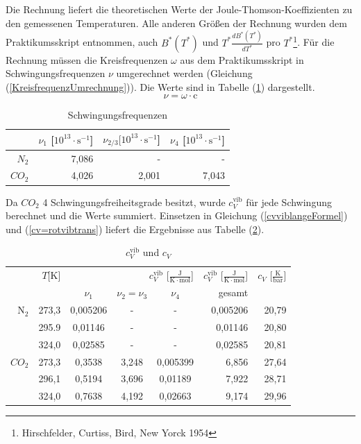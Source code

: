\documentclass[a4paper,12pt,oneside,onecolum,final,openany]{report}
\begin{document}
Die Rechnung liefert die theoretischen Werte der Joule-Thomson-Koeffizienten zu den gemessenen Temperaturen. Alle anderen Größen der Rechnung wurden dem Praktikumsskript entnommen, auch $B^*(T^*)$ und $T^*\frac{dB^*(T^*)}{dT^*}$ pro $T^*$\protect\footnote{Hirschfelder, Curtiss, Bird, New Yorck 1954}. Für die Rechnung müssen die Kreisfrequenzen $\omega$ aus dem Praktikumsskript in Schwingungsfrequenzen $\nu$ umgerechnet werden (Gleichung (\ref{KreisfrequenzUmrechnung})). Die Werte sind in Tabelle (\ref{TabelleSchwingungsfrequenzen}) dargestellt.  \\

\begin{equation}
\nu = \omega \cdot \mathrm{c} \label{KreisfrequenzUmrechnung}
\end{equation}


\begin{table}\caption{Schwingungsfrequenzen} \label{TabelleSchwingungsfrequenzen}
\begin{tabular}{r|r|r|r} 
& $\nu_{1}$ [$ 10^{13} \cdot \text{s}^{-1}$]& $\nu_{2/3} [10^{13} \cdot \text{s}^{-1}$]& $\nu_{4}$ [$ 10^{13} \cdot \text{s}^{-1}$]\\
\hline
$N_2$&7,086&-&-\\
$CO_2$& 4,026&	2,001&7,043\\
\end{tabular}
\end{table}


Da $CO_2$ 4 Schwingungsfreiheitsgrade besitzt, wurde $c_V^\mathrm{ vib}$ für jede Schwingung berechnet und die Werte summiert. Einsetzen in Gleichung (\ref{cvviblangeFormel}) und (\ref{cv=rotvibtrans}) liefert die Ergebnisse aus Tabelle (\ref{cvvibundcvTabelle}).\\

\begin{table}\caption{$c_V^\mathrm{vib}$ und $c_V$} \label{cvvibundcvTabelle}
\begin{tabular}{r|r|c|c|c|r|r}
&$T$[K]& \multicolumn{3}{|r|}{$c_V^\mathrm{vib}$ [$\frac{\mathrm{J}}{\mathrm{K}\cdot \mathrm{mol}}$] }&$c_V^\mathrm{vib}$ [$\frac{\mathrm{J}}{\mathrm{K}\cdot \mathrm{mol}}$] & $ c_V$ [$\frac{\mathrm{K}}{\mathrm{bar}}$] \\
&&$\nu_{1}$&$\nu_{2} = \nu_{3}$&$\nu_{4}$&gesamt&\\
\hline

	  $\text{N}_\mathrm{2}$ & 273,3&  0,005206&-& - &  0,005206 &20,79\\
	   & 295.9  &0,01146&-&-& 0,01146 &20,80\\
	  & 324,0 &0,02585 &-&-& 0,02585 & 20,81\\
\hline  
$CO_2$&273,3&0,3538&	3,248&	0,005399&6,856&27,64\\
&296,1&0,5194&	3,696&	0,01189&7,922&28,71\\
&324,0& 0,7638&	4,192&	0,02663&9,174&29,96\\
\end{tabular}
\end{table}
\FloatBarrier
\end{document}
